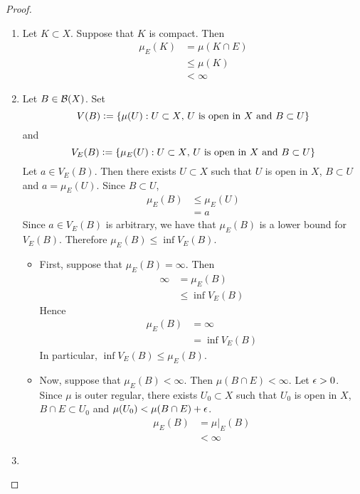 \documentclass{book}
\begin{document}
	\begin{proof}\
		\begin{enumerate}
			\item Let $K \subset X$. Suppose that $K$ is compact. Then 
			\begin{align*}
				\mu_E(K)
				& = \mu(K \cap E) \\
				& \leq \mu(K) \\
				& < \infty 
			\end{align*} 
			\item Let $B \in \mathcal{B}(X)$. Set
			$$V(B) \vcentcolon= \{\mu(U): U \subset X \text{, $U$ is open in $X$ and $B \subset U$}\}$$ 
			and 
			$$V_E(B) \vcentcolon= \{\mu_E(U): U \subset X \text{, $U$ is open in $X$ and $B \subset U$}\}$$
			Let $a \in V_E(B)$. Then there exists $U \subset X$ such that $U$ is open in $X$, $B \subset U$ and $a = \mu_E(U)$. Since $B \subset U$, 
			\begin{align*}
				\mu_E(B)
				& \leq \mu_E(U) \\
				& = a
			\end{align*} 
			Since $a \in V_E(B)$ is arbitrary, we have that $\mu_E(B)$ is a lower bound for $V_E(B)$. Therefore $\mu_E(B) \leq \inf V_E(B)$. 
			\begin{itemize}
				\item First, suppose that $\mu_E(B) = \infty$. Then 
				\begin{align*}
					\infty 
					& = \mu_E(B) \\
					& \leq \inf V_E(B)
				\end{align*}
				Hence 
				\begin{align*}
					\mu_E(B)
					& = \infty \\
					& = \inf V_E(B)
				\end{align*}
				In particular, $\inf V_E(B) \leq \mu_E(B)$. 
				\item  Now, suppose that $\mu_E(B) < \infty$. Then $\mu(B \cap E) < \infty$. Let $\epsilon > 0$. Since $\mu$ is outer regular, there exists $U_0 \subset X$ such that $U_0$ is open in $X$, $B \cap E \subset U_0$ and $\mu(U_0) < \mu(B \cap E) + \epsilon$.   
				\begin{align*}
					\mu_E(B)
					& = \mu|_E(B) \\
					& < \infty
				\end{align*}
			\end{itemize}
			\item 
		\end{enumerate}
	\end{proof}
\end{document}
